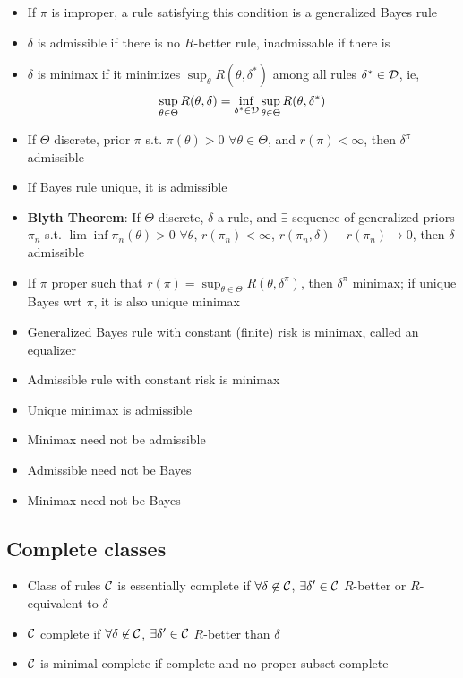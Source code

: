 \documentclass[fontsize=5pt]{scrartcl}
\begin{document}
\begin{multicols}{2}
\begin{itemize}
\item If $\pi$ is improper, a rule satisfying this condition is a
  generalized Bayes rule
\item $\delta$ is admissible if there is no $R$-better rule,
  inadmissable if there is
\item $\delta$ is minimax if it minimizes
  $\sup_{\theta}R(\theta,\delta^{*})$ among all rules
  $\delta^{*}\in{\cal D}$, ie,
  \begin{equation}
    \sup_{\theta\in\Theta}R(\theta,\delta) = \inf_{\delta^{*}\in{\cal D}}\sup_{\theta\in\Theta}R(\theta,\delta^{*})
  \end{equation}
\item If $\Theta$ discrete, prior $\pi$ s.t. $\pi(\theta)>0$
  $\forall\theta\in\Theta$, and $r(\pi)<\infty$, then $\delta^{\pi}$
  admissible
\item If Bayes rule unique, it is admissible
\item \textbf{Blyth Theorem}: If $\Theta$ discrete, $\delta$ a rule, and $\exists$ sequence of
  generalized priors $\pi_{n}$ s.t. $\lim \inf
  \pi_{n}(\theta)>0$ $\forall\theta$, $r(\pi_{n})<\infty$,
  $r(\pi_{n},\delta)-r(\pi_{n})\to0$, then $\delta$ admissible
\item If $\pi$ proper such that
  $r(\pi)=\sup_{\theta\in\Theta}R(\theta,\delta^{\pi})$, then
  $\delta^{\pi}$ minimax; if unique Bayes wrt $\pi$, it is also unique
  minimax
\item Generalized Bayes rule with constant (finite) risk is minimax,
  called an equalizer
\item Admissible rule with constant risk is minimax
\item Unique minimax is admissible
\item Minimax need not be admissible
\item Admissible need not be Bayes
\item Minimax need not be Bayes
\end{itemize}

\subsection{Complete classes}

\begin{itemize}
\item Class of rules ${\cal C}$ is essentially complete if
  $\forall\delta\not\in{\cal C}$, $\exists\delta'\in{\cal C}$
  $R$-better or $R$-equivalent to $\delta$
\item ${\cal C}$ complete if $\forall\delta\not\in{\cal C}$,
  $\exists\delta'\in{\cal C}$ $R$-better than $\delta$
\item ${\cal C}$ is minimal complete if complete and no proper subset
  complete
\end{itemize}


\end{multicols}
\end{document}

